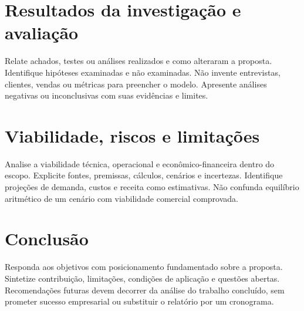 \chapter{Resultados da investigação e avaliação}
Relate achados, testes ou análises realizados e como alteraram a proposta.
Identifique hipóteses examinadas e não examinadas. Não invente entrevistas,
clientes, vendas ou métricas para preencher o modelo. Apresente análises
negativas ou inconclusivas com suas evidências e limites.

\chapter{Viabilidade, riscos e limitações}
Analise a viabilidade técnica, operacional e econômico-financeira dentro do
escopo. Explicite fontes, premissas, cálculos, cenários e incertezas. Identifique
projeções de demanda, custos e receita como estimativas. Não confunda equilíbrio
aritmético de um cenário com viabilidade comercial comprovada.

\chapter{Conclusão}
Responda aos objetivos com posicionamento fundamentado sobre a proposta.
Sintetize contribuição, limitações, condições de aplicação e questões abertas.
Recomendações futuras devem decorrer da análise do trabalho concluído, sem
prometer sucesso empresarial ou substituir o relatório por um cronograma.
